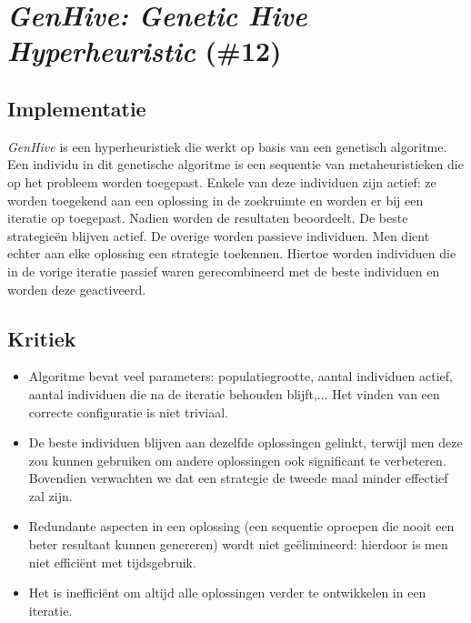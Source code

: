 \section{\emph{GenHive: Genetic Hive Hyperheuristic} (\#12)}
\label{sss:genhive}
\subsection{Implementatie}
\emph{GenHive}\cite{chesc-genhive} is een hyperheuristiek die werkt op basis van een genetisch algoritme. Een individu in dit genetische algoritme is een sequentie van metaheuristieken die op het probleem worden toegepast. Enkele van deze individuen zijn actief: ze worden toegekend aan een oplossing in de zoekruimte en worden er bij een iteratie op toegepast. Nadien worden de resultaten beoordeelt. De beste strategie\"en blijven actief. De overige worden passieve individuen. Men dient echter aan elke oplossing een strategie toekennen. Hiertoe worden individuen die in de vorige iteratie passief waren gerecombineerd met de beste individuen en worden deze geactiveerd.
\subsection{Kritiek}
\begin{itemize}
 \item Algoritme bevat veel parameters: populatiegrootte, aantal individuen actief, aantal individuen die na de iteratie behouden blijft,... Het vinden van een correcte configuratie is niet triviaal.
 \item De beste individuen blijven aan dezelfde oplossingen gelinkt, terwijl men deze zou kunnen gebruiken om andere oplossingen ook significant te verbeteren. Bovendien verwachten we dat een strategie de tweede maal minder effectief zal zijn.
 \item Redundante aspecten in een oplossing (een sequentie oproepen die nooit een beter resultaat kunnen genereren) wordt niet ge\"elimineerd: hierdoor is men niet effici\"ent met tijdsgebruik.
 \item Het is ineffici\"ent om altijd alle oplossingen verder te ontwikkelen in een iteratie.
\end{itemize}